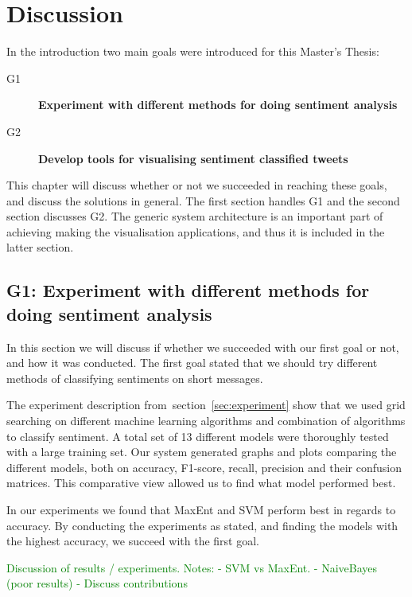 \chapter{Discussion}

In the introduction two main goals were introduced for this Master's Thesis:

\begin{description}

\item[G1] \textbf{Experiment with different methods for doing sentiment analysis}
	
\item[G2] \textbf{Develop tools for visualising sentiment classified tweets}

\end{description}

This chapter will discuss whether or not we succeeded in reaching these goals, and discuss the solutions in general. The first section handles G1 and the second section discusses G2. The generic system architecture is an important part of achieving making the visualisation applications, and thus it is included in the latter section.

\section{G1: Experiment with different methods for doing sentiment analysis}

In this section we will discuss if whether we succeeded with our first goal or not, and how it was conducted. The first goal stated that we should try different methods of classifying sentiments on short messages. 

The experiment description from~section~\ref{sec:experiment} show that we used grid searching on different machine learning algorithms and combination of algorithms to classify sentiment. A total set of 13 different models were thoroughly tested with a large training set. Our system generated graphs and plots comparing the different models, both on accuracy, F1-score, recall, precision and their confusion matrices. This comparative view allowed us to find what model performed best.

In our experiments we found that MaxEnt and SVM perform best in regards to accuracy. By conducting the experiments as stated, and finding the models with the highest accuracy, we succeed with the first goal.

\textcolor{green}{
	Discussion of results / experiments.
	Notes: 
		- SVM vs MaxEnt.
		- NaiveBayes (poor results)
		- Discuss contributions
}

